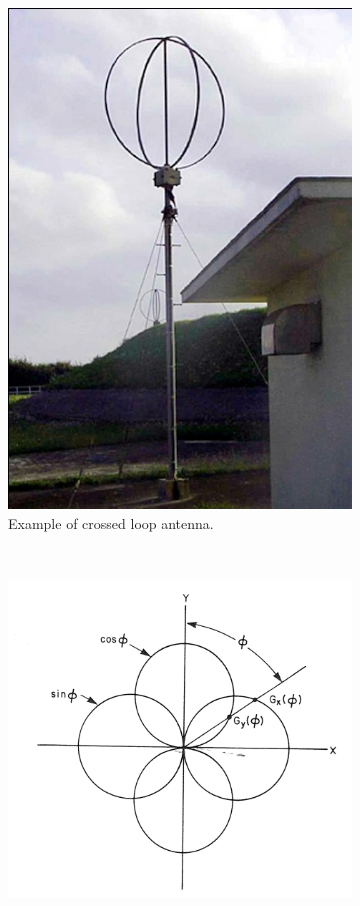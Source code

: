 \begin{figure}
  \centering
  \begin{subfigure}[b]{0.3\textwidth}
    \includegraphics[width=\textwidth]{./img/lit_review/loop_antenna_crossed}
    \caption{Example of crossed loop antenna.}
  \end{subfigure}
  ~
  \begin{subfigure}[b]{0.4\textwidth}
    \includegraphics[width=\textwidth]{./img/lit_review/loop_antenna_crossed_beam}

\end{subfigure}
\end{figure}
